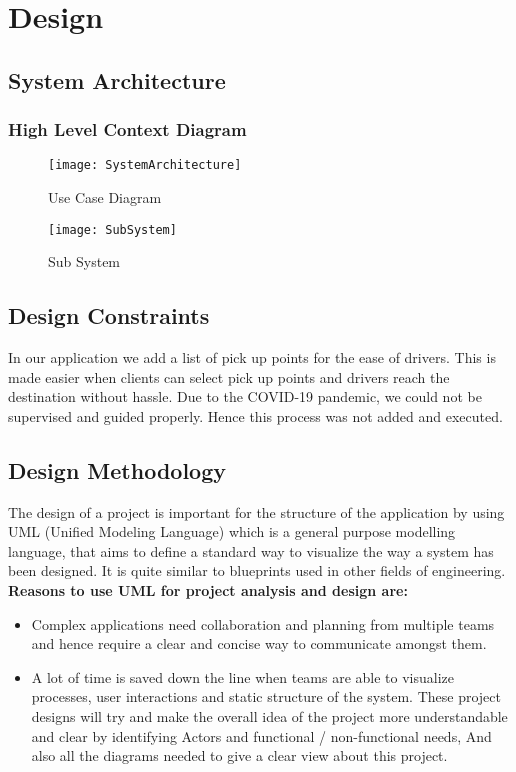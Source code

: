\chapter{Design} \label{chap:design}


\section*{}
\section{System Architecture}
  
\subsection{High Level Context Diagram}
\begin{figure}[ht]
\center
\texttt{[image: SystemArchitecture]}
\caption{Use Case Diagram}
\label{fig:UseCaseDiagram}
\end{figure}
\begin{figure}[ht]
\center
\texttt{[image: SubSystem]}
\caption{Sub System}
\label{fig:SubSystem}
\end{figure}

\section{Design Constraints} 
In our application we add a list of pick up points for the ease of drivers. This is made easier when clients can select pick up points and drivers reach the destination without hassle. Due to the COVID-19 pandemic, we could not be supervised and guided properly. Hence this process was not added and executed.
\section{Design Methodology}
The design of a project is important for the structure of the application by using UML (Unified Modeling Language) which is a general purpose modelling language, that aims to define a standard way to visualize the way a system has been designed. It is quite similar to blueprints used in other fields of engineering.
\\ \textbf{Reasons to use UML for project analysis and design are:} 

\begin{itemize}
\item Complex applications need collaboration and planning from multiple teams and hence require a clear and concise way to communicate amongst them.
\item A lot of time is saved down the line when teams are able to visualize processes, user interactions and static structure of the system.
These project designs will try and make the overall idea of the project more
understandable and clear by identifying Actors and functional / non-functional needs,
And also all the diagrams needed to give a clear view about this project.

\end{itemize}
